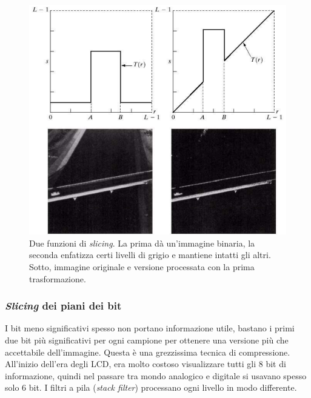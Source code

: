 \documentclass[a4paper,11pt]{article}
\begin{document}
\renewcommand{\thefigure}{5.13}
\begin{figure}[!h]
  \centering
    \includegraphics[scale=0.5]{images/5/slicing.png}
    \caption{Due funzioni di \textit{slicing}. La prima dà un'immagine binaria, la seconda enfatizza certi livelli di grigio e mantiene intatti gli altri.
    Sotto, immagine originale e versione processata con la prima trasformazione.}
\end{figure}

\newpage
\subsubsection{\textit{Slicing} dei piani dei bit}
I bit meno significativi spesso non portano informazione utile, bastano i primi due bit più significativi per ogni campione per ottenere una
versione più che accettabile dell'immagine. Questa è una grezzissima tecnica di compressione. All'inizio dell'era degli LCD, era molto costoso visualizzare
tutti gli 8 bit di informazione, quindi nel passare tra mondo analogico e digitale si usavano spesso solo 6 bit.
I filtri a pila (\textit{stack filter}) processano ogni livello in modo differente.
\end{document}
